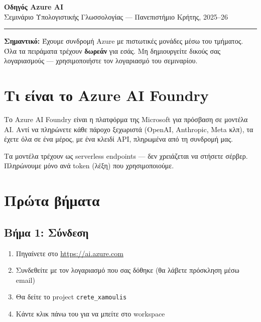\documentclass[11pt,a4paper]{article}
\begin{document}
\begin{center}
{\LARGE\bfseries\color{uocblue} Οδηγός Azure AI}\\[6pt]
{\large Σεμινάριο Υπολογιστικής Γλωσσολογίας --- Πανεπιστήμιο Κρήτης, 2025--26}\\[4pt]
\textcolor{uocblue}{\rule{\textwidth}{0.5pt}}
\end{center}

\vspace{4pt}

\begin{tcolorbox}[colback=uocblue!5, colframe=uocblue, sharp corners, boxrule=0.5pt]
\textbf{Σημαντικό:} Έχουμε συνδρομή Azure με πιστωτικές μονάδες μέσω του τμήματος. Όλα τα πειράματα τρέχουν \textbf{δωρεάν} για εσάς. Μη δημιουργείτε δικούς σας λογαριασμούς --- χρησιμοποιήστε τον λογαριασμό του σεμιναρίου.
\end{tcolorbox}

\section{Τι είναι το Azure AI Foundry}

Το Azure AI Foundry είναι η πλατφόρμα της Microsoft για πρόσβαση σε μοντέλα AI. Αντί να πληρώνετε κάθε πάροχο ξεχωριστά (OpenAI, Anthropic, Meta κλπ), τα έχετε όλα σε ένα μέρος, με ένα κλειδί API, πληρωμένα από τη συνδρομή μας.

Τα μοντέλα τρέχουν ως serverless endpoints --- δεν χρειάζεται να στήσετε σέρβερ. Πληρώνουμε μόνο ανά token (λέξη) που χρησιμοποιούμε.

\section{Πρώτα βήματα}

\subsection{Βήμα 1: Σύνδεση}

\begin{enumerate}[nosep]
\item Πηγαίνετε στο \url{https://ai.azure.com}
\item Συνδεθείτε με τον λογαριασμό που σας δόθηκε (θα λάβετε πρόσκληση μέσω email)
\item Θα δείτε το project \texttt{crete\_xamoulis}
\item Κάντε κλικ πάνω του για να μπείτε στο workspace
\end{enumerate}
\end{document}

